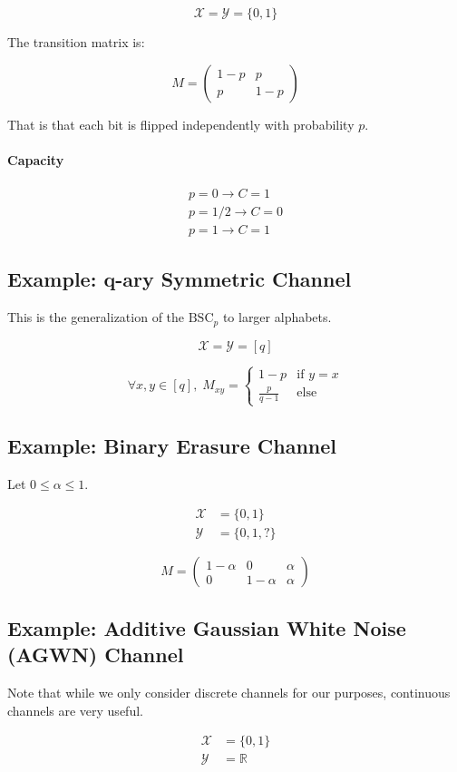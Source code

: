 \documentclass{idc_msc}
\begin{document}
\[\mathcal{X} = \mathcal{Y} = \{0,1\}\]

The transition matrix is:

\[
  M = \begin{pmatrix}
    1-p & p \\
    p & 1-p
  \end{pmatrix}
\]

That is that each bit is flipped independently with probability \(p\).

\paragraph{Capacity}

\[
\begin{aligned}
p = 0 \longrightarrow C=1 \\
p = 1/2 \longrightarrow C=0 \\
p = 1 \longrightarrow C=1
\end{aligned}
\]

\subsection{Example: q-ary Symmetric Channel}

This is the generalization of the \(\text{BSC}_p\) to larger alphabets.

\[\mathcal{X} = \mathcal{Y} = [q]\]

\[
\forall x,y \in [q], \; M_{xy} = \begin{cases}
  1 - p & \text{if }y = x \\
  \frac{p}{q-1} & \text{else}
\end{cases}
\]

\subsection{Example: Binary Erasure Channel}

Let \(0 \le \alpha \le 1\).

\[
\begin{aligned}
  \mathcal{X} & = \{0,1\} \\
  \mathcal{Y} & = \{0,1,?\}
\end{aligned}
\]

\[
M = \begin{pmatrix}
  1-\alpha & 0 & \alpha \\
  0 & 1-\alpha & \alpha
\end{pmatrix}
\]

\subsection{Example: Additive Gaussian White Noise (AGWN) Channel}

Note that while we only consider discrete channels for our purposes, continuous channels are very useful.

\[
\begin{aligned}
  \mathcal{X} & = \{0,1\} \\
  \mathcal{Y} & = \mathbb{R}
\end{aligned}
\]
\end{document}
